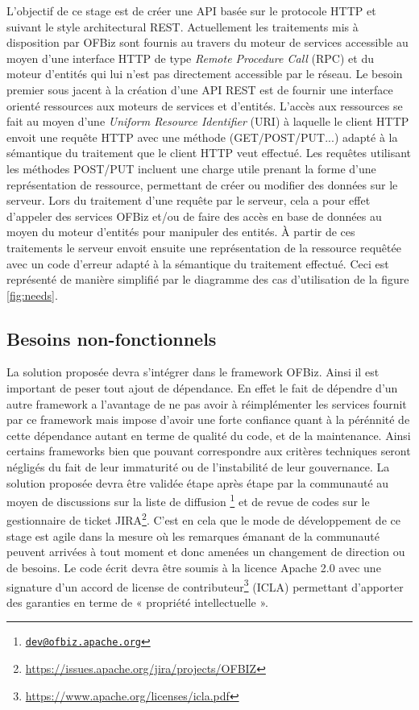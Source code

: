\documentclass[a4paper, 11pt]{report}
\begin{document}
L'objectif de ce stage est de créer une API basée sur le protocole
HTTP et suivant le style architectural REST. Actuellement les
traitements mis à disposition par OFBiz sont fournis au travers du
moteur de services accessible au moyen d'une interface HTTP de type
\emph{Remote Procedure Call} (RPC) et du moteur d'entités qui lui
n'est pas directement accessible par le réseau. Le besoin premier sous
jacent à la création d'une API REST est de fournir une interface
orienté ressources aux moteurs de services et d'entités. L'accès aux
ressources se fait au moyen d'une \emph{Uniform Resource Identifier}
(URI) à laquelle le client HTTP envoit une requête HTTP avec une
méthode (GET/POST/PUT...) adapté à la sémantique du traitement que le
client HTTP veut effectué. Les requêtes utilisant les méthodes
POST/PUT incluent une charge utile prenant la forme d'une
représentation de ressource, permettant de créer ou modifier des
données sur le serveur. Lors du traitement d'une requête par le
serveur, cela a pour effet d'appeler des services OFBiz et/ou de faire
des accès en base de données au moyen du moteur d'entités pour
manipuler des entités. À partir de ces traitements le serveur envoit
ensuite une représentation de la ressource requêtée avec un code
d'erreur adapté à la sémantique du traitement effectué. Ceci est
représenté de manière simplifié par le diagramme des cas d'utilisation
de la figure \ref{fig:needs}.

\subsection{Besoins non-fonctionnels}

La solution proposée devra s'intégrer dans le framework OFBiz. Ainsi
il est important de peser tout ajout de dépendance. En effet le fait
de dépendre d'un autre framework a l'avantage de ne pas avoir à
réimplémenter les services fournit par ce framework mais impose
d'avoir une forte confiance quant à la pérénnité de cette dépendance
autant en terme de qualité du code, et de la maintenance. Ainsi
certains frameworks bien que pouvant correspondre aux critères
techniques seront négligés du fait de leur immaturité ou de
l'instabilité de leur gouvernance.  La solution proposée devra être
validée étape après étape par la communauté au moyen de discussions
sur la liste de diffusion
\footnote{\href{mailto:dev@ofbiz.apache.org}{\nolinkurl{dev@ofbiz.apache.org}}}
et de revue de codes sur le gestionnaire de ticket
JIRA\footnote{\url{https://issues.apache.org/jira/projects/OFBIZ}}. C'est
en cela que le mode de développement de ce stage est agile dans la
mesure où les remarques émanant de la communauté peuvent arrivées à
tout moment et donc amenées un changement de direction ou de besoins.
Le code écrit devra être soumis à la licence Apache 2.0 avec une
signature d'un accord de license de
contributeur\footnote{\url{https://www.apache.org/licenses/icla.pdf}}
(ICLA) permettant d'apporter des garanties en terme de « propriété
intellectuelle ».
\end{document}
